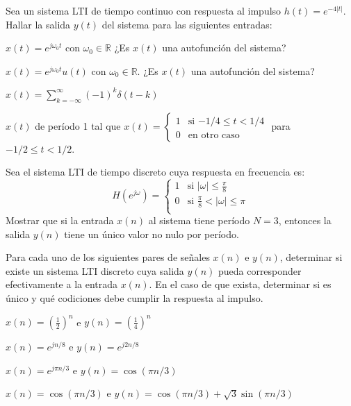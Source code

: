 \begin{ejercicio}
Sea un sistema LTI de tiempo continuo con respuesta al impulso $h(t) = e^{-4|t|}$. Hallar la salida $y(t)$ del sistema para las siguientes entradas:

\inciso $x(t)=e^{j\omega_0 t}$ con $\omega_0\in\mathbb{R}$ ¿Es $x(t)$ una autofunción del sistema?

\inciso $x(t)=e^{j\omega_0 t}u(t)$ con $\omega_0\in\mathbb{R}$. ¿Es $x(t)$ una autofunción del sistema?

\inciso $x(t)=\sum_{k=-\infty}^{\infty} (-1)^k \delta(t-k)$

\inciso $x(t)$ de período 1 tal que $x(t) = \begin{cases} 1 & \mbox{si $-1/4 \leq t < 1/4$} \\ 0 & \mbox{en otro caso} \end{cases}$ \hspace{1em} para $-1/2\leq t < 1/2$.
\end{ejercicio}

\begin{ejercicio}
    Sea el sistema LTI de tiempo discreto cuya respuesta en frecuencia es:
    \begin{equation*}
        H(e^{j\omega}) = \begin{cases}
            1 & \mbox{si $|\omega| \leq \frac{\pi}{8}$} \\
            0 & \mbox{si } \frac{\pi}{8} < |\omega| \leq \pi \\
        \end{cases}
    \end{equation*}
    Mostrar que si la entrada $x(n)$ al sistema tiene período $N=3$, entonces la salida $y(n)$ tiene un único valor no nulo por período. 
\end{ejercicio}

\begin{ejercicio}
Para cada uno de los siguientes pares de señales $x(n)$ e $y(n)$, determinar si existe un sistema LTI discreto cuya salida $y(n)$ pueda corresponder efectivamente a la entrada $x(n)$. En el caso de que exista, determinar si es único y qué codiciones debe cumplir la respuesta al impulso.

\inciso $x(n) = \left(\frac{1}{2}\right)^n$ e $y(n) = \left(\frac{1}{4}\right)^n$

\inciso $x(n)=e^{jn/8}$ e $y(n) = e^{j2n/8}$

\inciso $x(n)= e^{j\pi n/3}$ e $y(n) = \cos(\pi n/3)$

\inciso $x(n) = \cos(\pi n/3)$ e $y(n) = \cos(\pi n/3) + \sqrt{3} \sin(\pi n/3)$
\end{ejercicio}

